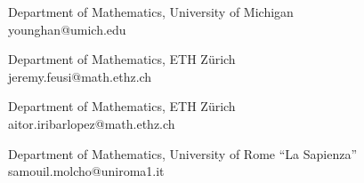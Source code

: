 \documentclass[11pt]{article}
\theoremstyle{definition}
\begin{document}
\noindent Department of Mathematics, University of Michigan \\
\noindent younghan@umich.edu

\vspace{8pt}

\noindent Department of Mathematics, ETH Z\"urich\\
\noindent jeremy.feusi@math.ethz.ch

\vspace{8pt}

\noindent Department of Mathematics, ETH Z\"urich\\
\noindent aitor.iribarlopez@math.ethz.ch

\vspace{8pt}

\noindent Department of Mathematics, University of Rome ``La Sapienza'' \\
\noindent samouil.molcho@uniroma1.it

\vspace{8pt}
\end{document}
